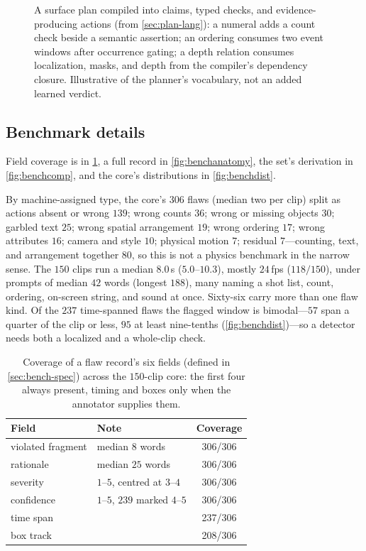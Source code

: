 \begin{figure}[tp]
  \centering
  
  \caption{A surface plan compiled into claims, typed checks, and evidence-producing
  actions (from \cref{sec:plan-lang}): a numeral adds a count check beside a semantic
  assertion; an ordering consumes two event windows after occurrence gating; a depth
  relation consumes localization, masks, and depth from the compiler's dependency
  closure. Illustrative of the planner's vocabulary, not an added learned verdict.}
  \label{fig:plangraph}
\end{figure}

\subsection{Benchmark details}\label{sec:app-benchmark}
Field coverage is in \cref{tab:flawfields}, a full record in \cref{fig:benchanatomy}, the set's
derivation in \cref{fig:benchcomp}, and the core's distributions in \cref{fig:benchdist}.

By machine-assigned type, the core's $306$ flaws (median two per clip) split as actions absent or
wrong $139$; wrong counts $36$; wrong or missing objects $30$; garbled text $25$; wrong spatial
arrangement $19$; wrong ordering $17$; wrong attributes $16$; camera and style $10$; physical motion
$7$; residual $7$---counting, text, and arrangement together $80$, so this is not a physics benchmark
in the narrow sense. The $150$ clips run a median $8.0$\,s ($5.0$--$10.3$), mostly $24$\,fps
($118/150$), under prompts of median $42$ words (longest $188$), many naming a shot list, count,
ordering, on-screen string, and sound at once. Sixty-six carry more than one flaw kind. Of the $237$
time-spanned flaws the flagged window is bimodal---$57$ span a quarter of the clip or less, $95$ at
least nine-tenths (\cref{fig:benchdist})---so a detector needs both a localized and a whole-clip
check.

\begin{table}[t]
\centering\small
\setlength{\tabcolsep}{6pt}\renewcommand{\arraystretch}{1.18}
\begin{tabular}{@{}l l c@{}}
\toprule
\textbf{Field} & \textbf{Note} & \textbf{Coverage} \\
\midrule
violated fragment & median $8$ words & 306/306 \\
rationale & median $25$ words & 306/306 \\
severity & $1$--$5$, centred at $3$--$4$ & 306/306 \\
confidence & $1$--$5$, $239$ marked $4$--$5$ & 306/306 \\
time span & & 237/306 \\
box track & & 208/306 \\
\bottomrule
\end{tabular}
\caption{Coverage of a flaw record's six fields (defined in \cref{sec:bench-spec}) across the
$150$-clip core: the first four always present, timing and boxes only when the annotator
supplies them.}
\label{tab:flawfields}
\end{table}


